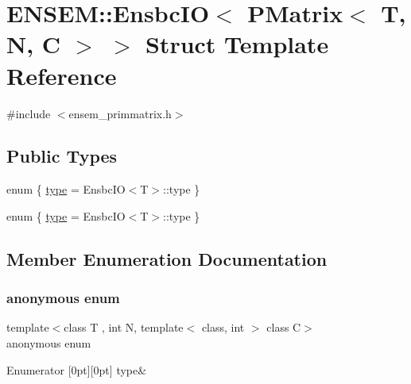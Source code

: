 \hypertarget{structENSEM_1_1EnsbcIO_3_01PMatrix_3_01T_00_01N_00_01C_01_4_01_4}{}\section{E\+N\+S\+EM\+:\+:Ensbc\+IO$<$ P\+Matrix$<$ T, N, C $>$ $>$ Struct Template Reference}
\label{structENSEM_1_1EnsbcIO_3_01PMatrix_3_01T_00_01N_00_01C_01_4_01_4}


{\ttfamily \#include $<$ensem\+\_\+primmatrix.\+h$>$}

\subsection*{Public Types}
\begin{DoxyCompactItemize}
\item 
enum \{ \mbox{\hyperlink{structENSEM_1_1EnsbcIO_3_01PMatrix_3_01T_00_01N_00_01C_01_4_01_4_a2ceec7f204f9f1a7161d1f74e8d0a558ab2030d38e88d687f09c823ba14fc80ef}{type}} = Ensbc\+IO$<$T$>$\+:\+:type
 \}
\item 
enum \{ \mbox{\hyperlink{structENSEM_1_1EnsbcIO_3_01PMatrix_3_01T_00_01N_00_01C_01_4_01_4_a2ceec7f204f9f1a7161d1f74e8d0a558ab2030d38e88d687f09c823ba14fc80ef}{type}} = Ensbc\+IO$<$T$>$\+:\+:type
 \}
\end{DoxyCompactItemize}


\subsection{Member Enumeration Documentation}
\mbox{\label{structENSEM_1_1EnsbcIO_3_01PMatrix_3_01T_00_01N_00_01C_01_4_01_4_a2ceec7f204f9f1a7161d1f74e8d0a558}} 
\subsubsection{\texorpdfstring{anonymous enum}{anonymous enum}}
{\footnotesize\ttfamily template$<$class T , int N, template$<$ class, int $>$ class C$>$ \\
anonymous enum}

\begin{DoxyEnumFields}{Enumerator}
[0pt][0pt]{}\mbox{\label{structENSEM_1_1EnsbcIO_3_01PMatrix_3_01T_00_01N_00_01C_01_4_01_4_a2ceec7f204f9f1a7161d1f74e8d0a558ab2030d38e88d687f09c823ba14fc80ef}} 
type&\\
\hline

\end{DoxyEnumFields}
\mbox{\label{structENSEM_1_1EnsbcIO_3_01PMatrix_3_01T_00_01N_00_01C_01_4_01_4_a54dc5769dc258d46f324457119064440}} 
